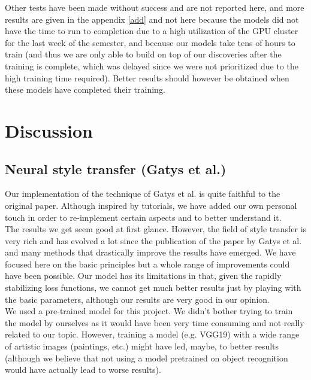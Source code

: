 \documentclass[twocolumn,superscriptaddress,aps,floatfix,nofootinbib]{revtex4-1}
\begin{document}
    Other tests have been made without success and are not reported here, and more results are given in the appendix \ref{add} and not here because the models did not have the time to run to completion due to a high utilization of the GPU cluster for the last week of the semester, and because our models take tens of hours to train (and thus we are only able to build on top of our discoveries after the training is complete, which was delayed since we were not prioritized due to the high training time required). Better results should however be obtained when these models have completed their training.
    
    
    
    
    
    \section{Discussion}\label{sec:discussion}
    
    \subsection{Neural style transfer (Gatys et al.)}
    
    Our implementation of the technique of Gatys et al. is quite faithful to the original paper. Although inspired by tutorials, we have added our own personal touch in order to re-implement certain aspects and to better understand it.\\
    
    The results we get seem good at first glance. However, the field of style transfer is very rich and has evolved a lot since the publication of the paper by Gatys et al. \cite{DBLP:journals/corr/GatysEB15a} and many methods that drastically improve the results have emerged. We have focused here on the basic principles but a whole range of improvements could have been possible. Our model has its limitations in that, given the rapidly stabilizing loss functions, we cannot get much better results just by playing with the basic parameters, although our results are very good in our opinion.\\
    
    We used a pre-trained model for this project. We didn't bother trying to train the model by ourselves as it would have been very time consuming and not really related to our topic. However, training a model (e.g. VGG19) with a wide range of artistic images (paintings, etc.) might have led, maybe, to better results (although we believe that not using a model pretrained on object recognition would have actually lead to worse results).\\
    
\end{document}

